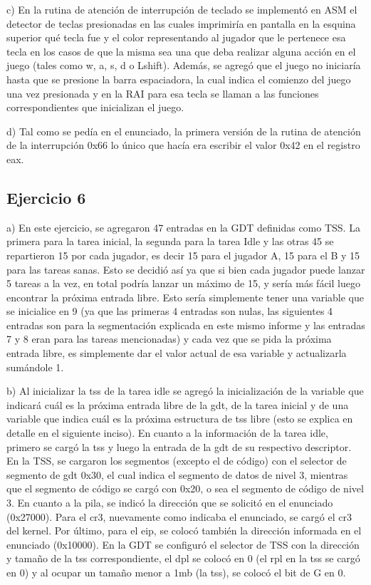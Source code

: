 \documentclass[a4paper]{article}
\begin{document}
c) En la rutina de atención de interrupción de teclado se implementó en ASM el detector de teclas presionadas en las cuales imprimiría en pantalla en la esquina
superior qué tecla fue y el color representando al jugador que le pertenece esa tecla en los casos de que la misma sea una que deba realizar alguna acción en el juego
(tales como w, a, s, d o Lshift). Además, se agregó que el juego no iniciaría hasta que se presione la barra espaciadora, la cual indica el comienzo del juego una vez presionada
y en la RAI para esa tecla se llaman a las funciones correspondientes que inicializan el juego.

d) Tal como se pedía en el enunciado, la primera versión de la rutina de atención de la interrupción 0x66 lo único que hacía era escribir el valor 0x42 en el registro eax.


\subsection{Ejercicio 6}

a) En este ejercicio, se agregaron 47 entradas en la GDT definidas como TSS. La primera para la tarea inicial,
la segunda para la tarea Idle y las otras 45 se repartieron 15 por cada jugador, es decir 15 para el jugador A,
15 para el B y 15 para las tareas sanas. Esto se decidió así ya que si bien cada jugador puede lanzar 5 tareas
a la vez, en total podría lanzar un máximo de 15, y sería más fácil luego encontrar la próxima entrada libre.
Esto sería simplemente tener una variable que se inicialice en 9 (ya que las primeras 4 entradas son nulas, las siguientes
 4 entradas son para la segmentación explicada en este mismo informe y las entradas 7 y 8 eran para las tareas mencionadas)
y cada vez que se pida la próxima entrada libre, es simplemente dar el valor actual de esa variable y actualizarla sumándole 1.

b) Al inicializar la tss de la tarea idle se agregó la inicialización de la variable que indicará cuál es la próxima entrada libre de la gdt, de la tarea inicial y
de una variable que indica cuál es la próxima estructura de tss libre (esto se explica en detalle en el siguiente inciso).
En cuanto a la información de la tarea idle, primero se cargó la tss y luego la entrada de la gdt de su respectivo descriptor.
En la TSS, se cargaron los segmentos (excepto el de código) con el selector de segmento de gdt 0x30, el cual indica el segmento de datos de nivel 3, mientras que el
segmento de código se cargó con 0x20, o sea el segmento de código de nivel 3. En cuanto a la pila, se indicó la dirección que se solicitó en el enunciado (0x27000).
Para el cr3, nuevamente como indicaba el enunciado, se cargó el cr3 del kernel. Por último, para el eip, se colocó también la dirección informada en el enunciado (0x10000).
En la GDT se configuró el selector de TSS con la dirección y tamaño de la tss correspondiente, el dpl se colocó en 0 (el rpl en la tss se cargó en 0) y al ocupar
un tamaño menor a 1mb (la tss), se colocó el bit de G en 0.
\end{document}
